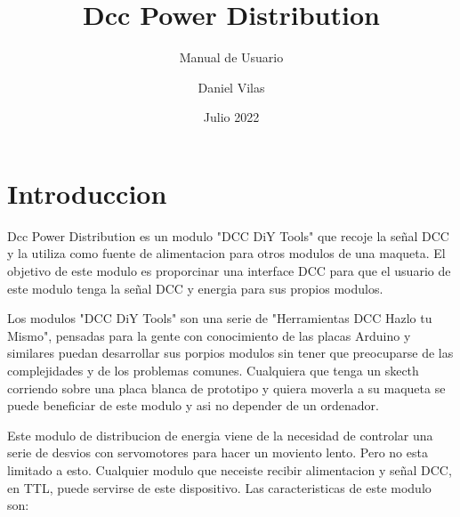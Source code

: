 \documentclass{DccDiyTools}
\title{Dcc Power Distribution}
\subtitle{Manual de Usuario}
\author{Daniel Vilas}
\date{Julio 2022}
\begin{document}
\maketitle


\section{Introduccion}
Dcc Power Distribution es un modulo "DCC DiY Tools" que recoje la señal DCC y la utiliza como fuente de alimentacion para otros modulos de una maqueta. 
El objetivo de este modulo es proporcinar una interface DCC para que el usuario de este modulo tenga la señal DCC y energia para sus propios modulos.

Los modulos "DCC DiY Tools" son una serie de "Herramientas DCC Hazlo tu Mismo", pensadas para la gente con conocimiento de las placas Arduino y similares
puedan desarrollar sus porpios modulos sin tener que preocuparse de las complejidades y de los problemas comunes. Cualquiera que tenga un skecth corriendo
sobre una placa blanca de prototipo y quiera moverla a su maqueta se puede beneficiar de este modulo y asi no depender de un ordenador. 

Este modulo de distribucion de energia viene de la necesidad de controlar una serie de desvios con servomotores para hacer un moviento lento. Pero no
esta limitado a esto. Cualquier modulo que neceiste recibir alimentacion y señal DCC, en TTL, puede servirse de este dispositivo. Las caracteristicas de
este modulo son:
\end{document}
